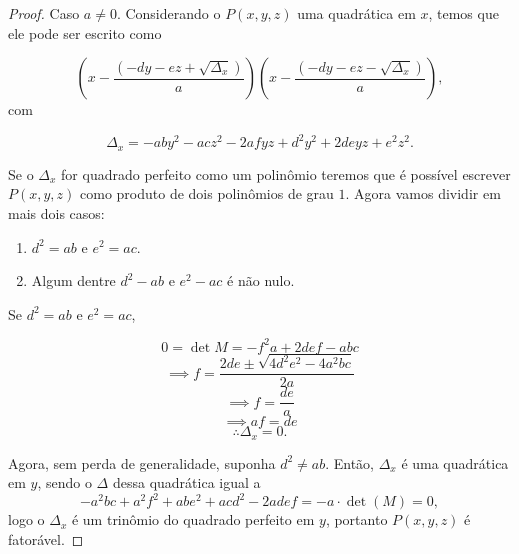\begin{proof}
Caso $a \ne 0$.
Considerando o $P(x,y,z)$ uma quadrática em $x$, temos que ele pode ser escrito como

\[ \left(x - \frac{(-dy - ez + \sqrt{\Delta_x})}{a}\right)\left(x - \frac{(-dy - ez - \sqrt{\Delta_x})}{a}\right),\]
com 

\[\Delta_x =-aby^2 - acz^2 - 2afyz + d^2y^2 + 2deyz + e^2z^2.\]

Se o $\Delta_x$ for quadrado perfeito como um polinômio teremos que é possível escrever $P(x,y,z)$ como produto de dois polinômios de grau $1$. Agora vamos dividir em mais dois casos:

\begin{enumerate}
    \item $d^2 = ab$ e $e^2 = ac$.
    \item Algum dentre $d^2 - ab$ e $e^2 - ac$ é não nulo. 
\end{enumerate}
Se $d^2 = ab$ e $e^2 = ac$, 

\[0 = \det M = -f^2a + 2def - abc\]
\[\implies f = \dfrac{2de\pm \sqrt{4d^2e^2-4a^2bc}}{2a}\]
\[\implies f = \dfrac{de}{a}\]
\[\implies af = de\]
\[\therefore \Delta_x = 0.\]

Agora, sem perda de generalidade, suponha $d^2\ne ab$. Então, $\Delta_x$ é uma quadrática em $y$, sendo o $\Delta$ dessa quadrática igual a 
\[-a^2bc + a^2f^2 + abe^2 + acd^2 - 2adef = -a\cdot\det(M) = 0,\]
logo o $\Delta_x $ é um trinômio do quadrado perfeito em $y$, portanto $P(x,y,z)$ é fatorável.
\end{proof}